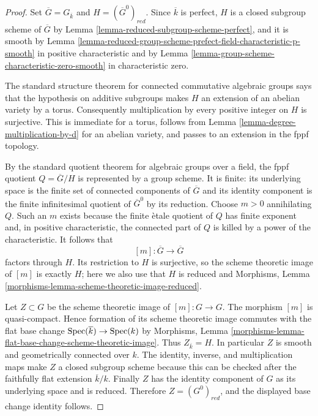 \begin{proof}
Set $\overline{G}=G_{\overline{k}}$ and
$H=(\overline{G}^0)_{red}$. Since $\overline{k}$ is perfect, $H$ is a closed
subgroup scheme of $\overline{G}$ by
Lemma \ref{lemma-reduced-subgroup-scheme-perfect}, and it is smooth by
Lemma \ref{lemma-reduced-group-scheme-prefect-field-characteristic-p-smooth}
in positive characteristic and by
Lemma \ref{lemma-group-scheme-characteristic-zero-smooth} in characteristic
zero.

The standard structure theorem for connected commutative algebraic groups
says that the hypothesis on additive subgroups makes $H$ an extension of an
abelian variety by a torus. Consequently multiplication by every positive
integer on $H$ is surjective. This is immediate for a torus, follows from
Lemma \ref{lemma-degree-multiplication-by-d} for an abelian variety, and
passes to an extension in the fppf topology.

By the standard quotient theorem for algebraic groups over a field, the fppf
quotient $Q=\overline{G}/H$ is represented by a group scheme. It is finite:
its underlying space is the finite set of connected components of
$\overline{G}$ and its identity component is the finite infinitesimal quotient
of $\overline{G}^0$ by its reduction. Choose $m>0$ annihilating $Q$. Such an
$m$ exists because the finite \`etale quotient of $Q$ has finite exponent and,
in positive characteristic, the connected part of $Q$ is killed by a power of
the characteristic. It follows that
$$
[m] : \overline{G}\longrightarrow\overline{G}
$$
factors through $H$. Its restriction to $H$ is surjective, so the scheme
theoretic image of $[m]$ is exactly $H$; here we also use that $H$ is reduced
and Morphisms, Lemma
\ref{morphisms-lemma-scheme-theoretic-image-reduced}.

Let $Z\subset G$ be the scheme theoretic image of $[m]:G\to G$. The morphism
$[m]$ is quasi-compact. Hence formation of its scheme theoretic image
commutes with the flat base change $\mathop{\mathrm{Spec}}(\overline{k})\to\mathop{\mathrm{Spec}}(k)$ by
Morphisms, Lemma
\ref{morphisms-lemma-flat-base-change-scheme-theoretic-image}. Thus
$Z_{\overline{k}}=H$. In particular $Z$ is smooth and geometrically
connected over $k$. The identity, inverse, and multiplication maps make $Z$
a closed subgroup scheme because this can be checked after the faithfully
flat extension $\overline{k}/k$. Finally $Z$ has the identity component of
$G$ as its underlying space and is reduced. Therefore $Z=(G^0)_{red}$, and
the displayed base change identity follows.
\end{proof}

